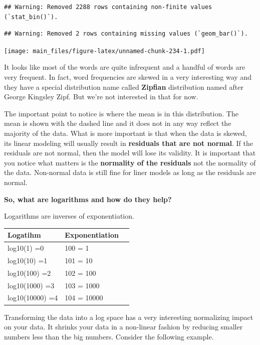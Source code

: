 \documentclass[
]{book}
\begin{document}
\begin{verbatim}
## Warning: Removed 2288 rows containing non-finite values (`stat_bin()`).
\end{verbatim}

\begin{verbatim}
## Warning: Removed 2 rows containing missing values (`geom_bar()`).
\end{verbatim}

\texttt{[image: main\_files/figure-latex/unnamed-chunk-234-1.pdf]}

It looks like most of the words are quite infrequent and a handful of words are very frequent. In fact, word frequencies are skewed in a very interesting way and they have a special distribution name called \textbf{Zipfian} distribution named after George Kingsley Zipf. But we're not interested in that for now.

The important point to notice is where the mean is in this distribution. The mean is shown with the dashed line and it does not in any way reflect the majority of the data. What is more important is that when the data is skewed, its linear modeling will usually result in \textbf{residuals that are not normal}. If the residuals are not normal, then the model will lose its validity. It is important that you notice what matters is the \textbf{normality of the residuals} not the normality of the data. Non-normal data is still fine for liner models as long as the residuals are normal.

\textbf{So, what are logarithms and how do they help?}

Logarithms are inverses of exponentiation.

\begin{longtable}[]{@{}lll@{}}
\toprule\noalign{}
\textbf{Logatihm} & \textbf{Exponentiation} & \\
\midrule\noalign{}
\endhead
\bottomrule\noalign{}
\endlastfoot
log10(1) =0 & 100 = 1 & \\
log10(10) =1 & 101 = 10 & \\
log10(100) =2 & 102 = 100 & \\
log10(1000) =3 & 103 = 1000 & \\
log10(10000) =4 & 104 = 10000 & \\
\end{longtable}

Transforming the data into a log space has a very interesting normalizing impact on your data. It shrinks your data in a non-linear fashion by reducing smaller numbers less than the big numbers. Consider the following example.
\end{document}
